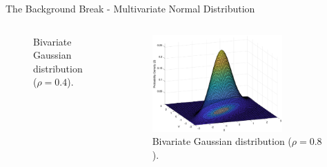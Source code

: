 \begin{frame}{The Background Break - Multivariate Normal Distribution}
\begin{columns}
\begin{figure}
        \caption{Bivariate Gaussian distribution ($\rho=0.4$).}
    \end{figure}
            \begin{figure}
    \centering
    \includegraphics[width=0.75\textwidth]{Figures/Background2/GaussuanSurface_Corr_0.8.eps}
        \vspace{-10pt}
        \caption{Bivariate Gaussian distribution ($\rho=0.8$).}
    \end{figure}
\end{columns}



\end{frame}

